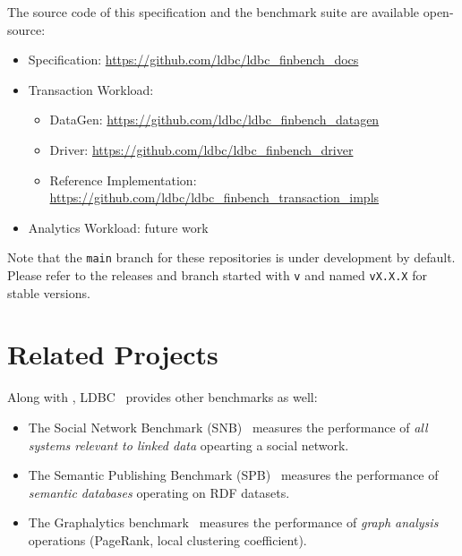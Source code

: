 The source code of this specification and the benchmark suite are available
open-source:
\begin{itemize}
    \item \ldbcfinbench Specification: \url{https://github.com/ldbc/ldbc_finbench_docs}
    \item Transaction Workload:
          \begin{itemize}
              \item \ldbcfinbench DataGen: \url{https://github.com/ldbc/ldbc_finbench_datagen}
              \item \ldbcfinbench Driver: \url{https://github.com/ldbc/ldbc_finbench_driver}
              \item \ldbcfinbench Reference Implementation: \url{https://github.com/ldbc/ldbc_finbench_transaction_impls}
          \end{itemize}
    \item Analytics Workload: future work
\end{itemize}

Note that the \texttt{main} branch for these repositories is under development by default.
Please refer to the releases and branch started with \texttt{v} and named \texttt{vX.X.X}
for stable versions.


\section{Related Projects}

Along with \ldbcfinbench, LDBC~\cite{DBLP:journals/sigmod/AnglesBLF0ENMKT14} provides other
benchmarks as well:

\begin{itemize}
    \item The Social Network Benchmark (SNB)~\cite{DBLP:journals/corr/abs-2001-02299} measures
          the performance of \emph{all systems relevant to linked data} opearting a social network.
    \item The Semantic Publishing Benchmark (SPB)~\cite{DBLP:conf/semweb/SpasicJP16} measures
          the performance of \emph{semantic databases} operating on RDF datasets.
    \item The Graphalytics benchmark~\cite{DBLP:journals/pvldb/IosupHNHPMCCSAT16} measures the
          performance of \emph{graph analysis} operations (\eg PageRank, local clustering coefficient).
\end{itemize}